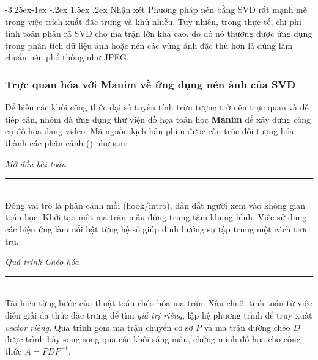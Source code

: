 \documentclass[a4paper]{article}
\makeatletter
\newcounter {subsubsubsection}[subsubsection]
\newcommand\subsubsubsection{\@startsection{subsubsubsection}{4}{\z@}%
                                     {-3.25ex\@plus -1ex \@minus -.2ex}%
                                     {1.5ex \@plus .2ex}%
                                     {\normalfont\normalsize\bfseries}}
\makeatother
\begin{document}
\subsubsubsection{Nhận xét}
Phương pháp nén bằng SVD rất mạnh mẽ trong việc trích xuất đặc trưng và khử nhiễu. Tuy nhiên, trong thực tế, chi phí tính toán phân rã SVD cho ma trận lớn khá cao, do đó nó thường được ứng dụng trong phân tích dữ liệu ảnh hoặc nén các vùng ảnh đặc thù hơn là dùng làm chuẩn nén phổ thông như JPEG.

\subsubsection{Trực quan hóa với Manim về ứng dụng nén ảnh của SVD}
Để biến các khối công thức đại số tuyến tính trừu tượng trở nên trực quan và dễ tiếp cận, nhóm đã ứng dụng thư viện đồ họa toán học \textbf{Manim} để xây dựng công cụ đồ họa dạng video. Mã nguồn kịch bản phim được cấu trúc đối tượng hóa thành các phân cảnh () như sau:

\vspace{0.3cm}
\begin{mdframed}[linecolor=gray!50, linewidth=3pt, topline=false, bottomline=false, rightline=false, backgroundcolor=black!2, innerleftmargin=10pt, innertopmargin=8pt, innerbottommargin=8pt]
\textbf{\large {}} \hfill \textit{Mở đầu bài toán}\\
\vspace{-0.2cm}\rule{\linewidth}{0.5pt}\vspace{0.2cm}\\
Đóng vai trò là phân cảnh mồi (hook/intro), dẫn dắt người xem vào không gian toán học. Khởi tạo một ma trận mẫu đứng trung tâm khung hình. Việc sử dụng các hiệu ứng làm nổi bật từng hệ số giúp định hướng sự tập trung một cách trơn tru.
\end{mdframed}

\vspace{0.2cm}
\begin{mdframed}[linecolor=gray!50, linewidth=3pt, topline=false, bottomline=false, rightline=false, backgroundcolor=black!2, innerleftmargin=10pt, innertopmargin=8pt, innerbottommargin=8pt]
\textbf{\large {}} \hfill \textit{Quá trình Chéo hóa}\\
\vspace{-0.2cm}\rule{\linewidth}{0.5pt}\vspace{0.2cm}\\
Tái hiện từng bước của thuật toán chéo hóa ma trận. Xâu chuỗi tính toán từ việc diễn giải đa thức đặc trưng để tìm \textit{giá trị riêng}, lập hệ phương trình để truy xuất \textit{vector riêng}. Quá trình gom ma trận chuyển cơ sở $P$ và ma trận đường chéo $D$ được trình bày song song qua các khối sáng màu, chứng minh đồ họa cho công thức $A = PDP^{-1}$.
\end{mdframed}
\end{document}
